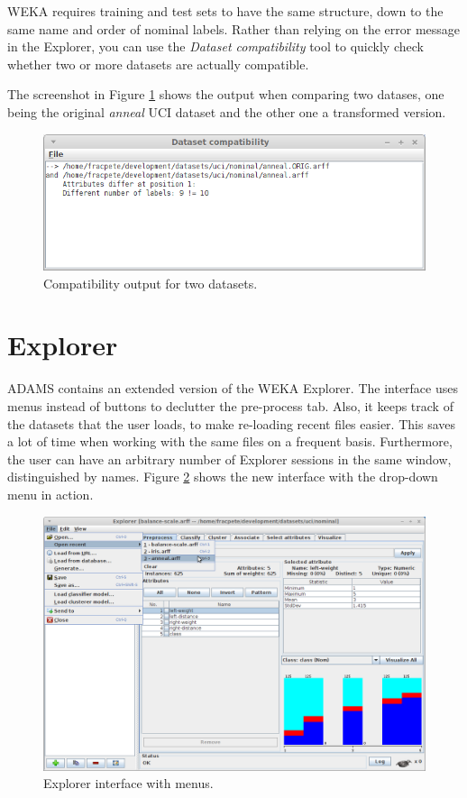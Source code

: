 WEKA requires training and test sets to have the same structure, down to the
same name and order of nominal labels. Rather than relying on the error message
in the Explorer, you can use the \textit{Dataset compatibility} tool to 
quickly check whether two or more datasets are actually compatible.

The screenshot in Figure \ref{dataset-compatibility} shows the output when
comparing two datases, one being the original \textit{anneal} UCI dataset
and the other one a transformed version.

\begin{figure}[htb]
  \centering
  \includegraphics[width=12.0cm]{images/dataset-compatibility.png}
  \caption{Compatibility output for two datasets.}
  \label{dataset-compatibility}
\end{figure}

\clearpage
\section{Explorer}
ADAMS contains an extended version of the WEKA Explorer. The interface uses
menus instead of buttons to declutter the pre-process tab. Also, it keeps track
of the datasets that the user loads, to make re-loading recent files easier.
This saves a lot of time when working with the same files on a frequent basis.
Furthermore, the user can have an arbitrary number of Explorer sessions in the
same window, distinguished by names. Figure \ref{explorerext} shows the new
interface with the drop-down menu in action.

\begin{figure}[htb]
  \centering
  \includegraphics[width=12.0cm]{images/explorerext.png}
  \caption{Explorer interface with menus.}
  \label{explorerext}
\end{figure}

